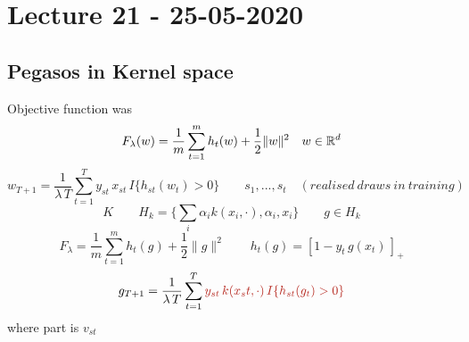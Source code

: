 \documentclass[../main.tex]{subfiles}
\begin{document}
\chapter{Lecture 21 - 25-05-2020}

\section{Pegasos in Kernel space}

Objective function was $$F_\lambda (w) = \frac{1}{m} \sum_{t=1}^{m} h_t(w) + \frac{1}{2} \|w\|^2 \quad w \in \mathbb{R}^d$$
$$
w_{T+1} = \frac{1}{\lambda \, T} \sum_{t=1}^T y_{st} \, x_{st} \, I \{ h_{st} (w_t) > 0 \} \qquad s_1, ..., s_t \quad (realised \ draws \ in \ training)
$$
$$
K \qquad H_k = \{ \sum_i \alpha_i k(x_i, \cdot) , \alpha_i, x_i \} \qquad g \in H_k
$$
$$
F_\lambda = \frac{1}{m} \sum_{t=1}^m h_t(g) + \frac{1}{2}
\| g\|^2 \qquad h_t(g) = \left[ 1- y_t \, g(x_t) \, \right]_+ $$
$$
g_{T+1} = \frac{1}{\lambda \, T} \sum_{t=1}^T \red{ y_{st} \, k (x_st, \cdot) \, I \{ h_{st}(g_t) > 0 \} }
$$
where  part is $v_{st}$
\end{document}

